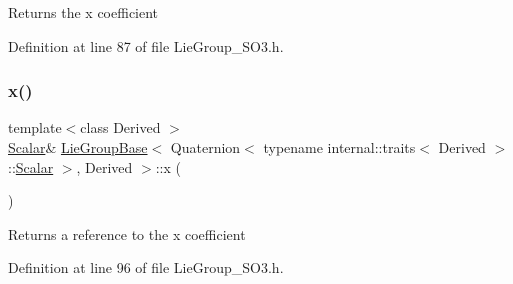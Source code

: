 \begin{DoxyReturn}{Returns}
the {\ttfamily x} coefficient 
\end{DoxyReturn}


Definition at line 87 of file Lie\+Group\+\_\+\+S\+O3.\+h.

\hypertarget{class_lie_group_base_3_01_quaternion_3_01typename_01internal_1_1traits_3_01_derived_01_4_1_1_scalar_01_4_00_01_derived_01_4_a6570cc6ec520a64f6a600b6eaa65001f}{}\label{class_lie_group_base_3_01_quaternion_3_01typename_01internal_1_1traits_3_01_derived_01_4_1_1_scalar_01_4_00_01_derived_01_4_a6570cc6ec520a64f6a600b6eaa65001f} 
\subsubsection{\texorpdfstring{x()}{x()}\hspace{0.1cm}{\footnotesize\ttfamily [2/2]}}
{\footnotesize\ttfamily template$<$class Derived $>$ \\
\hyperlink{class_lie_group_base_3_01_quaternion_3_01typename_01internal_1_1traits_3_01_derived_01_4_1_1_scalar_01_4_00_01_derived_01_4_afadeceb3b98e52deecc572e71efb82a8}{Scalar}\& \hyperlink{class_lie_group_base}{Lie\+Group\+Base}$<$ Quaternion$<$ typename internal\+::traits$<$ Derived $>$\+::\hyperlink{class_lie_group_base_3_01_quaternion_3_01typename_01internal_1_1traits_3_01_derived_01_4_1_1_scalar_01_4_00_01_derived_01_4_afadeceb3b98e52deecc572e71efb82a8}{Scalar} $>$, Derived $>$\+::x (\begin{DoxyParamCaption}{ }\end{DoxyParamCaption})\hspace{0.3cm}{\ttfamily [inline]}}

\begin{DoxyReturn}{Returns}
a reference to the {\ttfamily x} coefficient 
\end{DoxyReturn}


Definition at line 96 of file Lie\+Group\+\_\+\+S\+O3.\+h.

\hypertarget{class_lie_group_base_3_01_quaternion_3_01typename_01internal_1_1traits_3_01_derived_01_4_1_1_scalar_01_4_00_01_derived_01_4_adfe211eebf98d317cb457c5d6ca41403}{}\label{class_lie_group_base_3_01_quaternion_3_01typename_01internal_1_1traits_3_01_derived_01_4_1_1_scalar_01_4_00_01_derived_01_4_adfe211eebf98d317cb457c5d6ca41403} 
